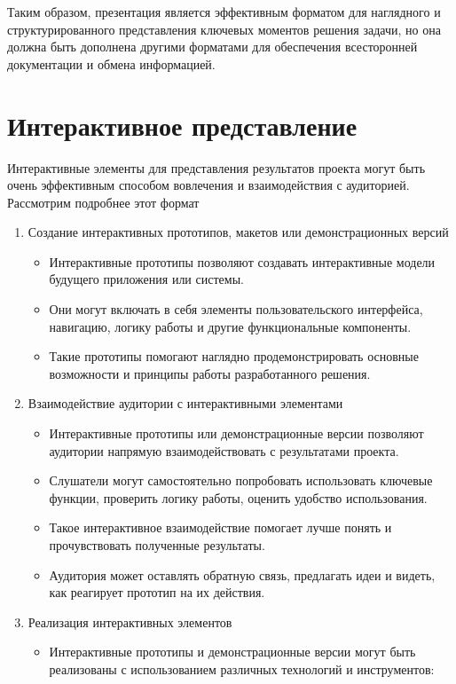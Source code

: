 Таким образом, презентация является эффективным форматом для наглядного и структурированного представления ключевых моментов решения задачи, но она должна быть дополнена другими форматами для обеспечения всесторонней документации и обмена информацией.

\section{Интерактивное представление}
Интерактивные элементы для представления результатов проекта могут быть очень эффективным способом вовлечения и взаимодействия с аудиторией. Рассмотрим подробнее этот формат
\begin{enumerate}
    \item Создание интерактивных прототипов, макетов или демонстрационных версий
        \begin{itemize}
            \item Интерактивные прототипы позволяют создавать интерактивные модели будущего приложения или системы.
            \item Они могут включать в себя элементы пользовательского интерфейса, навигацию, логику работы и другие функциональные компоненты.
            \item Такие прототипы помогают наглядно продемонстрировать основные возможности и принципы работы разработанного решения.
        \end{itemize}
    \item Взаимодействие аудитории с интерактивными элементами
        \begin{itemize}
            \item Интерактивные прототипы или демонстрационные версии позволяют аудитории напрямую взаимодействовать с результатами проекта.
            \item Слушатели могут самостоятельно попробовать использовать ключевые функции, проверить логику работы, оценить удобство использования.
            \item Такое интерактивное взаимодействие помогает лучше понять и прочувствовать полученные результаты.
            \item Аудитория может оставлять обратную связь, предлагать идеи и видеть, как реагирует прототип на их действия.
        \end{itemize}
    \item Реализация интерактивных элементов
        \begin{itemize}
            \item Интерактивные прототипы и демонстрационные версии могут быть реализованы с использованием различных технологий и инструментов:

\end{itemize}
\end{enumerate}
